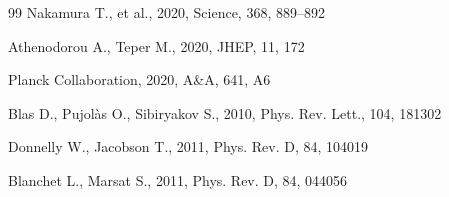 \documentclass[10pt]{article}
\begin{document}
\begin{thebibliography}{99}
Nakamura T., et al., 2020, Science, 368, 889--892

Athenodorou A., Teper M., 2020, JHEP, 11, 172

Planck Collaboration, 2020, A\&A, 641, A6

Blas D., Pujol\`as O., Sibiryakov S., 2010, Phys. Rev. Lett., 104, 181302

Donnelly W., Jacobson T., 2011, Phys. Rev. D, 84, 104019

Blanchet L., Marsat S., 2011, Phys. Rev. D, 84, 044056
\end{thebibliography}
\end{document}
